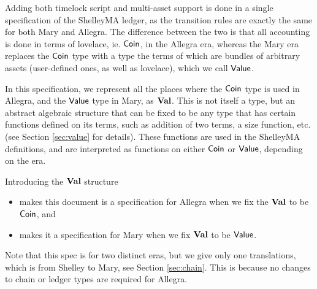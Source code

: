 Adding both timelock script and multi-asset support is done in a single specification
of the ShelleyMA ledger, as the transition rules are exactly the same for both
Mary and Allegra. The difference between the two is that all accounting is
done in terms of lovelace, ie. $\mathsf{Coin}$, in the Allegra era, whereas the Mary era
replaces the $\mathsf{Coin}$ type with a type the terms of which are bundles of arbitrary assets
(user-defined ones, as well as lovelace), which we call $\mathsf{Value}$.

In this specification, we represent all the places where the $\mathsf{Coin}$ type is used in Allegra,
and the $\mathsf{Value}$ type in Mary, as $\mathbf{Val}$. This is not itself a type, but an
abstract algebraic structure that can be fixed to be any type that has certain functions defined on its terms,
such as addition of two terms,
a size function, etc. (see Section \ref{sec:value} for details). These functions
are used in the ShelleyMA definitions, and are interpreted as functions on either
$\mathsf{Coin}$ or $\mathsf{Value}$, depending on the era.

Introducing the $\mathbf{Val}$ structure
\begin{itemize}
  \item makes this document is a specification for Allegra when we fix the $\mathbf{Val}$
  to be $\mathsf{Coin}$, and
  \item makes it a specification for Mary when we fix $\mathbf{Val}$ to be
  $\mathsf{Value}$.
\end{itemize}

Note that this spec is for two distinct eras, but we give only one translations, which is
from Shelley to Mary, see Section \ref{sec:chain}. This is because no changes to
chain or ledger types are required for Allegra.
